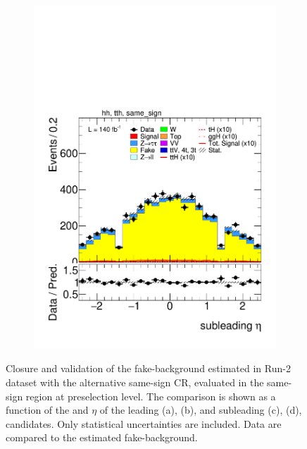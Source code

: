 \begin{figure}[htbp]
\begin{subfigure}[b]{0.45\textwidth}
      \includegraphics[width=\textwidth]{images/same_sign_same_sign_run2/plot_tau_1_eta_hh_tth_15_16_17_18_same_sign.pdf}
      \caption{}
    \end{subfigure}

    \caption{
    Closure and validation of the fake-\tauhad background estimated in Run-2 dataset with the alternative same-sign \tauhadhad CR, evaluated in the same-sign region at preselection level.
    The comparison is shown as a function of the \pt and $\eta$ of the leading (a), (b), and subleading (c), (d), \tauhad candidates. Only statistical uncertainties are included.
    Data are compared to the estimated fake-\tauhad background.
  }
  \label{fig:closure_validation_same_sign_run2}
\end{figure}

